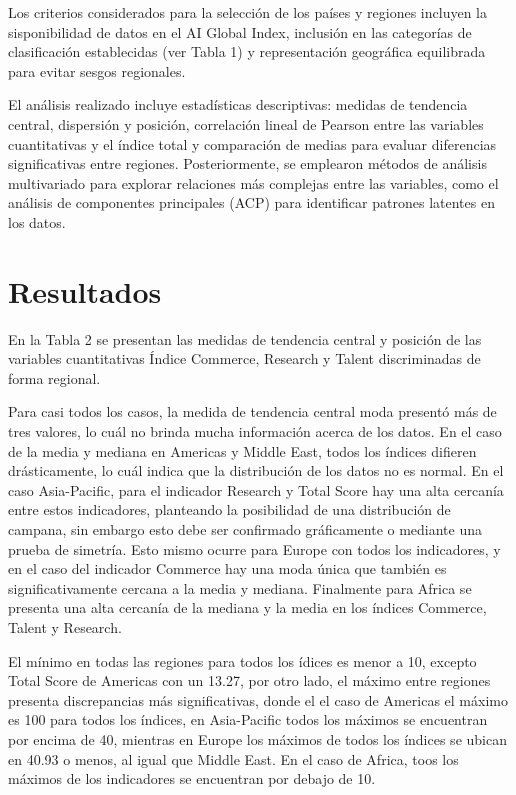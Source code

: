 \documentclass[
]{article}
\begin{document}
\begin{multicols}{2}
Los criterios considerados para la selección de los países y regiones incluyen la sisponibilidad de datos en el AI Global Index, inclusión en las categorías de clasificación establecidas (ver Tabla 1) y representación geográfica equilibrada para evitar sesgos regionales.

El análisis realizado incluye estadísticas descriptivas: medidas de tendencia central, dispersión y posición, correlación lineal de Pearson entre las variables cuantitativas y el índice total y comparación de medias para evaluar diferencias significativas entre regiones. Posteriormente, se emplearon métodos de análisis multivariado para explorar relaciones más complejas entre las variables, como el análisis de componentes principales (ACP) para identificar patrones latentes en los datos.

\section{Resultados}
En la Tabla 2 se presentan las medidas de tendencia central y posición de las variables cuantitativas Índice Commerce, Research y Talent discriminadas de forma regional. 

Para casi todos los casos, la medida de tendencia central moda presentó más de tres valores, lo cuál no brinda mucha información acerca de los datos. En el caso de la media y mediana en Americas y Middle East, todos los índices difieren drásticamente, lo cuál indica que la distribución de los datos no es normal. En el caso Asia-Pacific, para el indicador Research y Total Score hay una alta cercanía entre estos indicadores, planteando la posibilidad de una distribución de campana, sin embargo esto debe ser confirmado gráficamente o mediante una prueba de simetría. Esto mismo ocurre para Europe con todos los indicadores, y en el caso del indicador Commerce hay una moda única que también es significativamente cercana a la media y mediana. Finalmente para Africa se presenta una alta cercanía de la mediana y la media en los índices Commerce, Talent y Research.

El mínimo en todas las regiones para todos los ídices es menor a 10, excepto Total Score de Americas con un 13.27, por otro lado, el máximo entre regiones presenta discrepancias más significativas, donde el el caso de Americas el máximo es 100 para todos los índices, en Asia-Pacific todos los máximos se encuentran por encima de 40, mientras en Europe los máximos de todos los índices se ubican en 40.93 o menos, al igual que Middle East. En el caso de Africa, toos los máximos de los indicadores se encuentran por debajo de 10.

\end{multicols}
\end{document}
